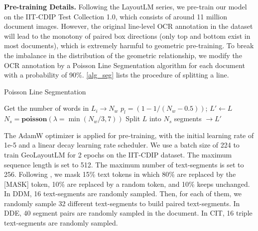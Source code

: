\documentclass[10pt,twocolumn,letterpaper]{article}
\begin{document}
\noindent \textbf{Pre-training Details.}
Following the LayoutLM series\cite{xu2020layoutlm,xu2020layoutlmv2,huang2022layoutlmv3}, we pre-train our model on the IIT-CDIP Test Collection 1.0\cite{lewis2006building}, which consists of around 11 million document images.
However, the original line-level OCR annotation in the dataset will lead to the monotony of paired box directions (only top and bottom exist in most documents), which is extremely harmful to geometric pre-training.
To break the imbalance in the distribution of the geometric relationship, we modify the OCR annotation by a Poisson Line Segmentation algorithm for each document with a probability of 90\%. \cref{alg_seg} lists the procedure of splitting a line.

\begin{algorithm}
  \caption{Poisson Line Segmentation}\label{alg_seg}
  Get the number of words in $L_i \to N_w$\;
  $p_l = (1 - 1 / (N_w - 0.5))$; \footnotesize{}
   {
    $L' \gets L$
  }{
    $N_s = \mathbf{poisson}(\lambda =\min(N_w/3, 7))$\;
    Split $L$ into $N_s$ segments $\to L'$\;
  }
\end{algorithm}

The AdamW optimizer is applied for pre-training, with the initial learning rate of 1e-5 and a linear decay learning rate scheduler.
We use a batch size of 224 to train GeoLayoutLM for 2 epochs on the IIT-CDIP dataset.
The maximum sequence length is set to 512. The maximum number of text-segments is set to 256.
Following \cite{xu2020layoutlm,xu2020layoutlmv2,huang2022layoutlmv3}, we mask 15\% text tokens in which 80\% are replaced by the [MASK] token, 10\% are replaced by a random token, and 10\% keeps unchanged.
In DDM, 16 text-segments are randomly sampled. Then, for each of them, we randomly sample 32 different text-segments to build paired text-segments.
In DDE, 40 segment pairs are randomly sampled in the document.
In CIT, 16 triple text-segments are randomly sampled.
\end{document}

